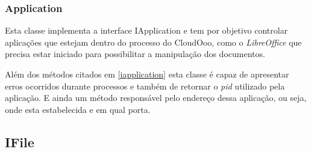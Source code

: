 \subsubsection{Application}
\label{application}

Esta classe implementa a interface IApplication e tem por objetivo controlar aplicações que estejam dentro do processo do CloudOoo, como o \textit{LibreOffice} que precisa estar iniciado para possibilitar a manipulação dos documentos.

Além dos métodos citados em \ref{iapplication} esta classe é capaz de apresentar erros ocorridos durante processos e também de retornar o \textit{pid} utilizado pela aplicação. E ainda um método responsável pelo endereço dessa aplicação, ou seja, onde esta estabelecida e em qual porta.


\subsection{IFile}
\label{ifile}

